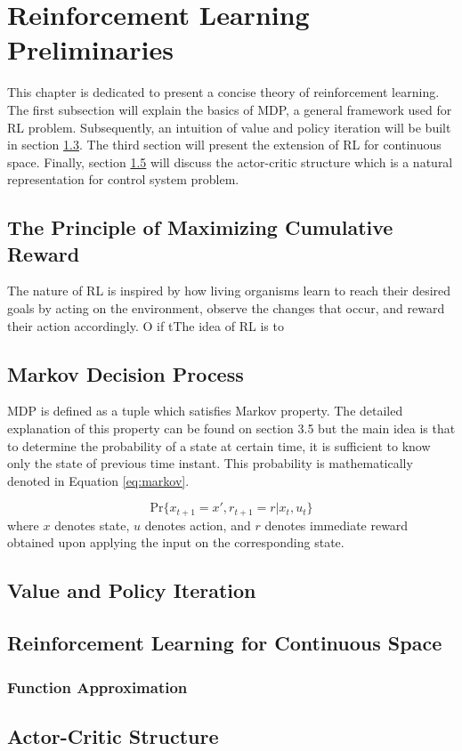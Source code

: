 \chapter{Reinforcement Learning Preliminaries}
This chapter is dedicated to present a concise theory of reinforcement learning. The first subsection will explain the basics of \ac{MDP}, a general framework used for \ac{RL} problem. Subsequently, an intuition of value and policy iteration will be built in section \ref{sec:value_iter}. The third section will present the extension of  \ac{RL} for continuous space. Finally, section \ref{sec:actor} will discuss the actor-critic structure which is a natural representation for control system problem.

\section{The Principle of Maximizing Cumulative Reward}
The nature of \ac{RL} is inspired by how living organisms learn to reach their desired goals by acting on the environment, observe the changes that occur, and reward their action accordingly. O if tThe idea of \ac{RL} is to 

\section{Markov Decision Process}
\ac{MDP} is defined as a tuple which satisfies Markov property. The detailed explanation of this property can be found on \cite{sutton1998reinforcement} section 3.5 but the main idea is that to determine the probability of a state at certain time, it is sufficient to know only the state of previous time instant. This probability is mathematically denoted in Equation \eqref{eq:markov}.

\begin{equation}
	\text{Pr}\{x_{t+1} = x', r_{t+1} = r| x_t, u_t \}
	\label{eq:markov}
\end{equation}
where $x$ denotes state, $u$ denotes action, and $r$ denotes immediate reward obtained upon applying the input on the corresponding state.

\section{Value and Policy Iteration} \label{sec:value_iter}

\section{Reinforcement Learning for Continuous Space}
\subsection{Function Approximation}


\section{Actor-Critic Structure} \label{sec:actor}
